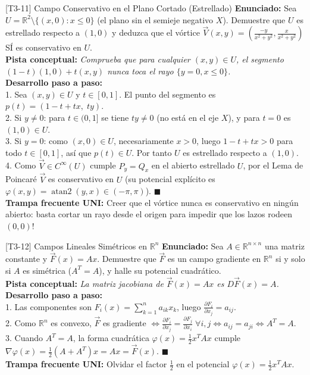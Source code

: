 \documentclass[11pt,a4paper]{article}
\begin{document}
\begin{ejerciciobox}{[T3-11] Campo Conservativo en el Plano Cortado (Estrellado)}
\textbf{Enunciado:} Sea $U = \mathbb{R}^2 \setminus \{(x,0) : x \le 0\}$ (el plano sin el semieje negativo $X$). Demuestre que $U$ es estrellado respecto a $(1,0)$ y deduzca que el vórtice $\vec{V}(x,y) = \left(\frac{-y}{x^2+y^2}, \frac{x}{x^2+y^2}\right)$ SÍ es conservativo en $U$.\\[0.2cm]
\textbf{Pista conceptual:} \emph{Comprueba que para cualquier $(x,y) \in U$, el segmento $(1-t)(1,0) + t(x,y)$ nunca toca el rayo $\{y=0, x\le 0\}$.}\\[0.2cm]
\textbf{Desarrollo paso a paso:}\\
1. Sea $(x,y) \in U$ y $t \in [0,1]$. El punto del segmento es $p(t) = (1-t + tx,\; ty)$.\\
2. Si $y \neq 0$: para $t \in (0,1]$ se tiene $ty \neq 0$ (no está en el eje $X$), y para $t=0$ es $(1,0) \in U$.\\
3. Si $y = 0$: como $(x,0) \in U$, necesariamente $x > 0$, luego $1-t+tx > 0$ para todo $t\in[0,1]$, así que $p(t) \in U$. Por tanto $U$ es estrellado respecto a $(1,0)$.\\
4. Como $\vec{V} \in C^\infty(U)$ cumple $P_y = Q_x$ en el abierto estrellado $U$, por el Lema de Poincaré $\vec{V}$ es conservativo en $U$ (su potencial explícito es $\varphi(x,y) = \operatorname{atan2}(y,x) \in (-\pi, \pi)$). $\blacksquare$\\[0.2cm]
\textbf{Trampa frecuente UNI:} Creer que el vórtice nunca es conservativo en ningún abierto: basta cortar un rayo desde el origen para impedir que los lazos rodeen $(0,0)$!
\end{ejerciciobox}

\begin{ejerciciobox}{[T3-12] Campos Lineales Simétricos en $\mathbb{R}^n$}
\textbf{Enunciado:} Sea $A \in \mathbb{R}^{n\times n}$ una matriz constante y $\vec{F}(x) = Ax$. Demuestre que $\vec{F}$ es un campo gradiente en $\mathbb{R}^n$ si y solo si $A$ es simétrica ($A^T = A$), y halle su potencial cuadrático.\\[0.2cm]
\textbf{Pista conceptual:} \emph{La matriz jacobiana de $\vec{F}(x) = Ax$ es $D\vec{F}(x) = A$.}\\[0.2cm]
\textbf{Desarrollo paso a paso:}\\
1. Las componentes son $F_i(x) = \sum_{k=1}^n a_{ik}x_k$, luego $\frac{\partial F_i}{\partial x_j} = a_{ij}$.\\
2. Como $\mathbb{R}^n$ es convexo, $\vec{F}$ es gradiente $\iff \frac{\partial F_i}{\partial x_j} = \frac{\partial F_j}{\partial x_i}\; \forall i,j \iff a_{ij} = a_{ji} \iff A^T = A$.\\
3. Cuando $A^T = A$, la forma cuadrática $\varphi(x) = \frac{1}{2} x^T A x$ cumple $\nabla\varphi(x) = \frac{1}{2}(A + A^T)x = Ax = \vec{F}(x)$. $\blacksquare$\\[0.2cm]
\textbf{Trampa frecuente UNI:} Olvidar el factor $\frac{1}{2}$ en el potencial $\varphi(x) = \frac{1}{2}x^T A x$.
\end{ejerciciobox}
\end{document}
